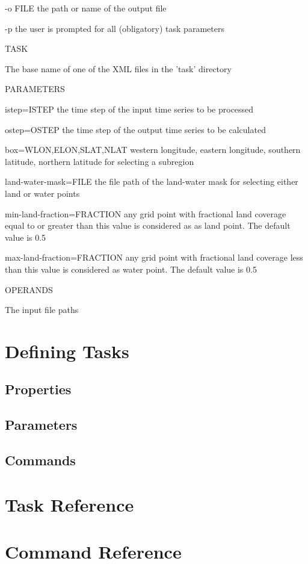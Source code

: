 \documentclass[
square
,pdftex
]{refrep}
\begin{document}
    -o FILE
        the path or name of the output file

    -p
        the user is prompted for all (obligatory) task parameters


TASK

    The base name of one of the XML files in the 'task' directory


PARAMETERS

    istep=ISTEP
        the time step of the input time series to be processed

    ostep=OSTEP
        the time step of the output time series to be calculated

    box=WLON,ELON,SLAT,NLAT
        western longitude, eastern longitude, southern latitude, northern
        latitude for selecting a subregion

    land-water-mask=FILE
        the file path of the land-water mask for selecting either land or
        water points

    min-land-fraction=FRACTION
        any grid point with fractional land  coverage equal to or greater
        than this value is considered as as land point. The default value
        is 0.5

    max-land-fraction=FRACTION
        any grid point with fractional land coverage less than this value
        is considered as water point. The default value is 0.5


OPERANDS

    The input file paths


\chapter{Defining Tasks}
\label{taskDef}

\section{Properties}

\section{Parameters}

\section{Commands}


\chapter{Task Reference}
\label{taskRef}

\chapter{Command Reference}
\label{commandRef}

\printindex
\end{document}
